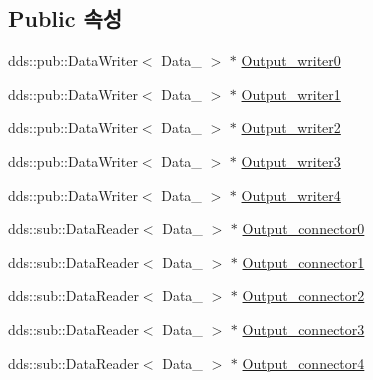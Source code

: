 \subsection*{Public 속성}
\begin{DoxyCompactItemize}
\item 
dds\+::pub\+::\+Data\+Writer$<$ Data\+\_ $>$ $\ast$ \hyperlink{classOutputDataPort__Fac_a56a9a1580ad01a693130fe625241117e}{Output\+\_\+writer0}
\item 
dds\+::pub\+::\+Data\+Writer$<$ Data\+\_ $>$ $\ast$ \hyperlink{classOutputDataPort__Fac_aed0b1cc297325160080bd8e419b56af5}{Output\+\_\+writer1}
\item 
dds\+::pub\+::\+Data\+Writer$<$ Data\+\_ $>$ $\ast$ \hyperlink{classOutputDataPort__Fac_a0839f4e13e85a690e7f9b3ecdccc0319}{Output\+\_\+writer2}
\item 
dds\+::pub\+::\+Data\+Writer$<$ Data\+\_ $>$ $\ast$ \hyperlink{classOutputDataPort__Fac_a4223e7e2d3f2eda4ccf80e3515b6067a}{Output\+\_\+writer3}
\item 
dds\+::pub\+::\+Data\+Writer$<$ Data\+\_ $>$ $\ast$ \hyperlink{classOutputDataPort__Fac_afed1a43ceb53aca5055a7178e06ff796}{Output\+\_\+writer4}
\item 
dds\+::sub\+::\+Data\+Reader$<$ Data\+\_ $>$ $\ast$ \hyperlink{classOutputDataPort__Fac_af1078cb28c44c09b3d831e073f37fc87}{Output\+\_\+connector0}
\item 
dds\+::sub\+::\+Data\+Reader$<$ Data\+\_ $>$ $\ast$ \hyperlink{classOutputDataPort__Fac_a9c7324b8997072b5431910321d6d7c3b}{Output\+\_\+connector1}
\item 
dds\+::sub\+::\+Data\+Reader$<$ Data\+\_ $>$ $\ast$ \hyperlink{classOutputDataPort__Fac_aa855af59d69d03b63b8bfd2c9e382e43}{Output\+\_\+connector2}
\item 
dds\+::sub\+::\+Data\+Reader$<$ Data\+\_ $>$ $\ast$ \hyperlink{classOutputDataPort__Fac_a1af0578ddf88e8e55fdcd0d60ff5cbdf}{Output\+\_\+connector3}
\item 
dds\+::sub\+::\+Data\+Reader$<$ Data\+\_ $>$ $\ast$ \hyperlink{classOutputDataPort__Fac_a2aa8ee8913f4c2964d3b69eaa03f406e}{Output\+\_\+connector4}
\end{DoxyCompactItemize}
